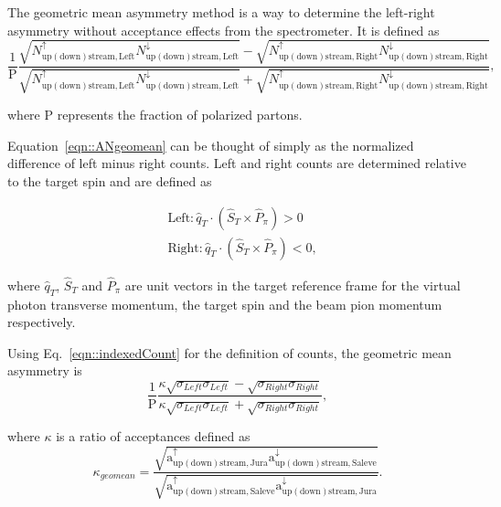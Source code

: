 The geometric mean asymmetry method is a way to determine the left-right
asymmetry without acceptance effects from the spectrometer.  It is defined as
\begin{equation}
  \label{eqn::ANgeomean}
  \frac{1}{\mathrm{P}}\frac{\sqrt{N_{\mathrm{up(down)stream,
          Left}}^{\uparrow}N_{\mathrm{up(down)stream, Left}}^{\downarrow}} -
    \sqrt{N_{\mathrm{up(down)stream, Right}}^{\uparrow}N_{\mathrm{up(down)stream,
          Right}}^{\downarrow}} }{\sqrt{N_{\mathrm{up(down)stream,
          Left}}^{\uparrow}N_{\mathrm{up(down)stream, Left}}^{\downarrow}} +
    \sqrt{N_{\mathrm{up(down)stream, Right}}^{\uparrow}N_{\mathrm{up(down)stream,
          Right}}^{\downarrow}} },
\end{equation}

\noindent
where P represents the fraction of polarized partons.

Equation~\ref{eqn::ANgeomean} can be thought of simply as the normalized
difference of left minus right counts.  Left and right counts are determined
relative to the target spin and are defined as

\begin{equation}
  \label{equ::Defleftright}
  \begin{aligned}
    &\text{Left}: \hat{q}_T \cdot (\hat{S}_T \times \hat{P}_{\pi}) > 0 \\
    &\text{Right}: \hat{q}_T \cdot (\hat{S}_T \times \hat{P}_{\pi}) < 0, 
  \end{aligned}
\end{equation}

\noindent
where $\hat{q}_T$, $\hat{S}_T$ and $\hat{P}_{\pi}$ are unit vectors in the
target reference frame for the virtual photon transverse momentum, the target
spin and the beam pion momentum respectively.

Using Eq.~\ref{eqn::indexedCount} for the definition of counts, the geometric
mean asymmetry is
\begin{equation}
  \label{eqn::ANgeomean_expand}
  \frac{1}{\mathrm{P}}\frac{\kappa \sqrt{\sigma_{Left}\sigma_{Left}} -
    \sqrt{\sigma_{Right}\sigma_{Right}}}{\kappa \sqrt{\sigma_{Left}\sigma_{Left}}
    + \sqrt{\sigma_{Right}\sigma_{Right}}},
\end{equation}

\noindent
where $\kappa$ is a ratio of acceptances defined as
\begin{equation}
  \kappa_{geomean} =
  \frac{\sqrt{\mathrm{a}^{\uparrow}_{\mathrm{up(down)stream,Jura}}
      \mathrm{a}^{\downarrow}_{\mathrm{up(down)stream,Saleve}}}}
       {\sqrt{\mathrm{a}^{\uparrow}_{\mathrm{up(down)stream,Saleve}}
           \mathrm{a}^{\downarrow}_{\mathrm{up(down)stream,Jura}}}}.
       \label{equ::accGeoMean}
\end{equation}


